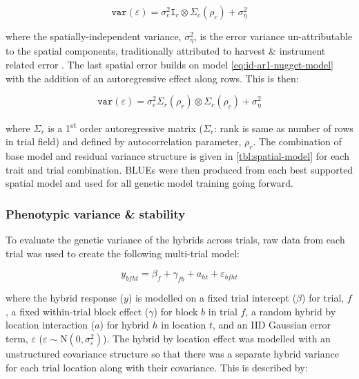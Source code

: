 \begin{refsection}
\begin{equation}
\mathtt{var}(\varepsilon) = \sigma^2_e \mathtt I_r\otimes\Sigma_c(\rho_c) + \sigma^2_{\eta} \label{eq:id-ar1-nugget-model}
\end{equation}

where the spatially-independent variance, \(\sigma^2_{\eta}\), is the error variance un-attributable to the spatial components, traditionally attributed to harvest \& instrument related error \parencite{Muller2010}. The last spatial error builds on model \eqref{eq:id-ar1-nugget-model} with the addition of an autoregressive effect along rows. This is then:

\begin{equation}
\mathtt{var}(\varepsilon) = \sigma^2_e\Sigma_r(\rho_r)\otimes\Sigma_c(\rho_c) + \sigma^2_{\eta}   
\label{eq:ar1-ar1-nugget-model}
\end{equation}

where \(\Sigma_r\) is a 1\textsuperscript{st} order autoregressive matrix (\(\mathtt \Sigma_r\): rank is same as number of rows in trial field) and defined by autocorrelation parameter, \(\rho_r\). The combination of base model and residual variance structure is given in \ref{tbl:spatial-model} for each trait and trial combination. BLUEs were then produced from each best supported spatial model and used for all genetic model training going forward.

\subsubsection{Phenotypic variance \& stability}

To evaluate the genetic variance of the hybrids across trials, raw data from each trial was used to create the following multi-trial model:

\begin{equation}
y_{bfht} = \beta_f +\gamma_{fb} + a_{ht} + \varepsilon_{bfht} 
\label{eq:multi-pheno}
\end{equation}

where the hybrid response (\(y\)) is modelled on a fixed trial intercept (\(\beta\)) for trial, \(f\), a fixed within-trial block effect (\(\gamma\)) for block \(b\) in trial \(f\), a random hybrid by location interaction (\(a\)) for hybrid \(h\) in location \(t\), and an IID Gaussian error term, \(\varepsilon\) (\(\varepsilon \sim \mathrm{N} \left ( 0, \sigma_{\varepsilon}^2 \right )\)). The hybrid by location effect was modelled with an unstructured covariance structure so that there was a separate hybrid variance for each trial location along with their covariance. This is described by:


\end{refsection}
